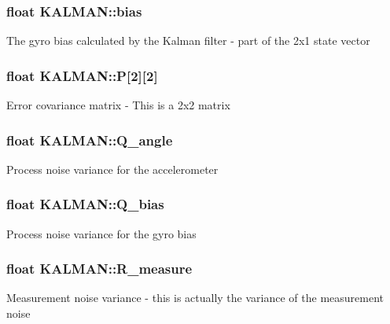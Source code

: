 \subsubsection[{\texorpdfstring{bias}{bias}}]{\setlength{\rightskip}{0pt plus 5cm}float K\+A\+L\+M\+A\+N\+::bias}\hypertarget{struct_k_a_l_m_a_n_aa68aa8fbee41f0180f107fae39b4d44b}{}\label{struct_k_a_l_m_a_n_aa68aa8fbee41f0180f107fae39b4d44b}
The gyro bias calculated by the Kalman filter -\/ part of the 2x1 state vector 
\subsubsection[{\texorpdfstring{P}{P}}]{\setlength{\rightskip}{0pt plus 5cm}float K\+A\+L\+M\+A\+N\+::P\mbox{[}2\mbox{]}\mbox{[}2\mbox{]}}\hypertarget{struct_k_a_l_m_a_n_a361e4602cfa284d862f2cbdfd34b1ddd}{}\label{struct_k_a_l_m_a_n_a361e4602cfa284d862f2cbdfd34b1ddd}
Error covariance matrix -\/ This is a 2x2 matrix 
\subsubsection[{\texorpdfstring{Q\+\_\+angle}{Q_angle}}]{\setlength{\rightskip}{0pt plus 5cm}float K\+A\+L\+M\+A\+N\+::\+Q\+\_\+angle}\hypertarget{struct_k_a_l_m_a_n_aa01590888375644c333d19896f117d63}{}\label{struct_k_a_l_m_a_n_aa01590888375644c333d19896f117d63}
Process noise variance for the accelerometer 
\subsubsection[{\texorpdfstring{Q\+\_\+bias}{Q_bias}}]{\setlength{\rightskip}{0pt plus 5cm}float K\+A\+L\+M\+A\+N\+::\+Q\+\_\+bias}\hypertarget{struct_k_a_l_m_a_n_a2c94df3643ff19d4031af1fe7e5a3840}{}\label{struct_k_a_l_m_a_n_a2c94df3643ff19d4031af1fe7e5a3840}
Process noise variance for the gyro bias 
\subsubsection[{\texorpdfstring{R\+\_\+measure}{R_measure}}]{\setlength{\rightskip}{0pt plus 5cm}float K\+A\+L\+M\+A\+N\+::\+R\+\_\+measure}\hypertarget{struct_k_a_l_m_a_n_a5f9d475ffd34d89ef5e9e265236df4c4}{}\label{struct_k_a_l_m_a_n_a5f9d475ffd34d89ef5e9e265236df4c4}
Measurement noise variance -\/ this is actually the variance of the measurement noise 
